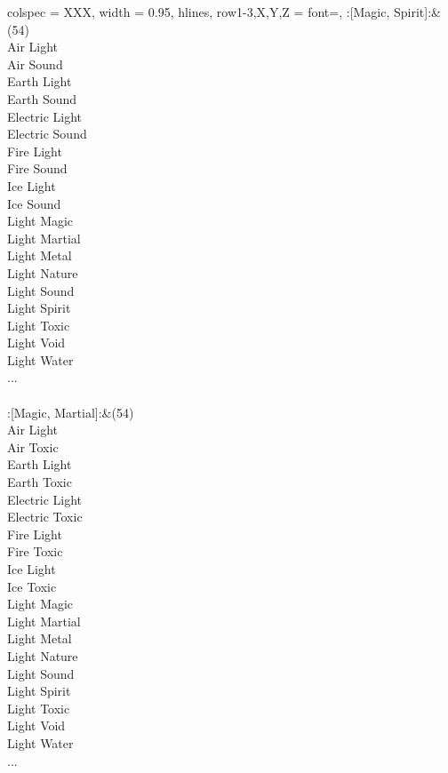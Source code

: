\begin{longtblr}[
	caption = {2v2 Defending Weak},
	label = {2v2-Defending-Weak},
]{
	colspec = {XXX}, width = 0.95\linewidth,
	hlines,
	row{1-3,X,Y,Z} = {font=\bfseries},
}
	:[Magic, Spirit]:&{(54)\\
	Air Light \\
	Air Sound \\
	Earth Light \\
	Earth Sound \\
	Electric Light \\
	Electric Sound \\
	Fire Light \\
	Fire Sound \\
	Ice Light \\
	Ice Sound \\
	Light Magic \\
	Light Martial \\
	Light Metal \\
	Light Nature \\
	Light Sound \\
	Light Spirit \\
	Light Toxic \\
	Light Void \\
	Light Water \\
	...\\
	}\\

	:[Magic, Martial]:&{(54)\\
	Air Light \\
	Air Toxic \\
	Earth Light \\
	Earth Toxic \\
	Electric Light \\
	Electric Toxic \\
	Fire Light \\
	Fire Toxic \\
	Ice Light \\
	Ice Toxic \\
	Light Magic \\
	Light Martial \\
	Light Metal \\
	Light Nature \\
	Light Sound \\
	Light Spirit \\
	Light Toxic \\
	Light Void \\
	Light Water \\
	...\\
	}\\


\end{longtblr}
